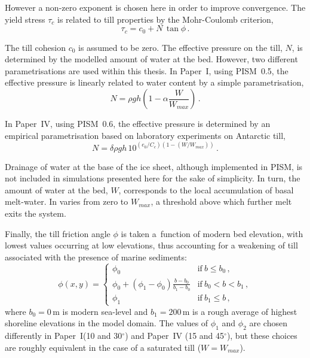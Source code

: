 \documentclass{article}
\newcommand{\CCLI}[0]{Paper~I}      %
\newcommand{\CCYC}[0]{Paper~IV}     %
\begin{document}
However a non-zero exponent is chosen here in order to improve convergence. The
yield stress $\tau_c$ is related to till properties by the Mohr-Coulomb
criterion,
\begin{equation}
   \tau_c = c_0 + N\,\tan{\phi} \,.
\end{equation}

The till cohesion $c_0$ is assumed to be zero. The effective pressure on the
till, $N$, is determined by the modelled amount of water at the bed. However,
two different parametrisations are used within this thesis. In {\CCLI}, using
PISM~0.5, the effective pressure is linearly related to water content by a
simple parametrisation,
\begin{equation}
    N = \rho gh (1 - \alpha \frac{W}{W_{max}}) \,.
\end{equation}

In {\CCYC}, using PISM~0.6, the effective pressure is determined by an
empirical parametrisation based on laboratory experiments on Antarctic till,
\begin{equation}
    N = \delta \rho gh \, 10^{(e_0/C_c) (1 - (W/W_{max}))} \,.
\end{equation}

Drainage of water at the base of the ice sheet, although implemented in PISM,
is not included in simulations presented here for the sake of simplicity.
In turn, the amount of water at the bed, $W$, corresponds to the local
accumulation of basal melt-water. In varies from zero to $W_{max}$, a threshold
above which further melt exits the system.

Finally, the till friction angle $\phi$ is taken a~function of modern bed
elevation, with lowest values occurring at low elevations, thus accounting for
a weakening of till associated with the presence of marine sediments:
\begin{equation}
    \phi(x,y) =
    \begin{cases}
        \phi_0 & \text{if}\ b \le b_0 \,, \\
        \phi_0 + (\phi_1-\phi_0) \frac{b - b_0}{b_1-b_0}
                & \text{if}\ b_0 < b < b_1 \,, \\
        \phi_1 & \text{if}\ b_1 \le b \,,
    \end{cases}
\end{equation}
where $b_0=0$\,m is modern sea-level and $b_1=200$\,m is a rough average of
highest shoreline elevations in the model domain. The values of $\phi_1$ and
$\phi_2$ are chosen differently in \CCLI (10 and 30$^\circ$) and \CCYC
(15 and 45$^\circ$), but these choices are roughly equivalent in the case of a
saturated till ($W=W_{max}$).
\end{document}
